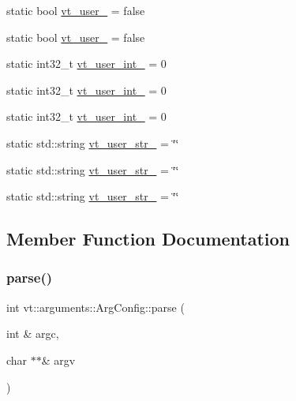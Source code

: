 \begin{DoxyCompactItemize}
\item 
static bool \hyperlink{structvt_1_1arguments_1_1_arg_config_a0c3fedfb03820032fc87969ff3eabd77}{vt\+\_\+user\+\_} = false
\item 
static bool \hyperlink{structvt_1_1arguments_1_1_arg_config_a91c4c1cdfab2def4254db74c705245f6}{vt\+\_\+user\+\_} = false
\item 
static int32\+\_\+t \hyperlink{structvt_1_1arguments_1_1_arg_config_a8592495c8eb82047645a9b5e0b741907}{vt\+\_\+user\+\_\+int\+\_} = 0
\item 
static int32\+\_\+t \hyperlink{structvt_1_1arguments_1_1_arg_config_ac80c25baf981f06e7f37045371a5336d}{vt\+\_\+user\+\_\+int\+\_} = 0
\item 
static int32\+\_\+t \hyperlink{structvt_1_1arguments_1_1_arg_config_a2dc50d3f0598a0a998923695f681c93a}{vt\+\_\+user\+\_\+int\+\_} = 0
\item 
static std\+::string \hyperlink{structvt_1_1arguments_1_1_arg_config_a892f7cf1b072e8fec60f5b88762f151e}{vt\+\_\+user\+\_\+str\+\_} = \char`\"{}\char`\"{}
\item 
static std\+::string \hyperlink{structvt_1_1arguments_1_1_arg_config_aaac3dd90077934c6faa99570d9b95ca1}{vt\+\_\+user\+\_\+str\+\_} = \char`\"{}\char`\"{}
\item 
static std\+::string \hyperlink{structvt_1_1arguments_1_1_arg_config_a848bd14c34337ef8d48fd740061a4923}{vt\+\_\+user\+\_\+str\+\_} = \char`\"{}\char`\"{}
\end{DoxyCompactItemize}


\subsection{Member Function Documentation}
\mbox{\label{structvt_1_1arguments_1_1_arg_config_ae47fd5ec6ec8607e0adbe4655b840062}} 
\subsubsection{\texorpdfstring{parse()}{parse()}}
{\footnotesize\ttfamily int vt\+::arguments\+::\+Arg\+Config\+::parse (\begin{DoxyParamCaption}\item[{int \&}]{argc,  }\item[{char $\ast$$\ast$\&}]{argv }\end{DoxyParamCaption})\hspace{0.3cm}{\ttfamily [static]}}



